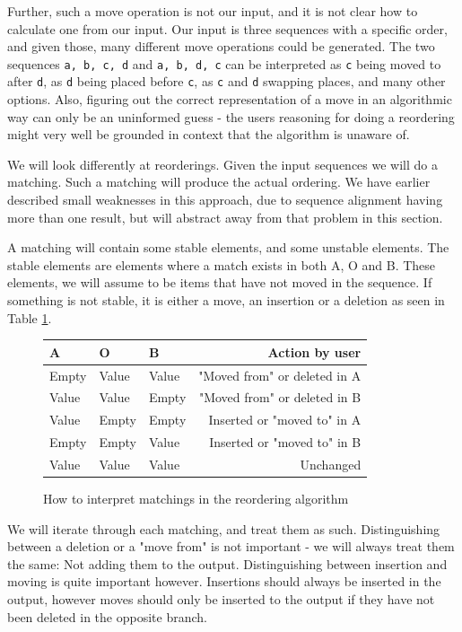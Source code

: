 \documentclass[11pt]{article}
\begin{document}
Further, such a move operation is not our input, and it is not clear how to calculate one from our input. Our input is three sequences with a specific order, and given those, many different move operations could be generated. The two sequences \texttt{a, b, c, d} and \texttt{a, b, d, c} can be interpreted as \texttt{c} being moved to after \texttt{d}, as \texttt{d} being placed before \texttt{c}, as \texttt{c} and \texttt{d} swapping places, and many other options. Also, figuring out the correct representation of a move in an algorithmic way can only be an uninformed guess - the users reasoning for doing a reordering might very well be grounded in context that the algorithm is unaware of.

We will look differently at reorderings. Given the input sequences we will do a matching. Such a matching will produce the actual ordering. We have earlier described small weaknesses in this approach, due to sequence alignment having more than one result, but will abstract away from that problem in this section.

A matching will contain some stable elements, and some unstable elements. The stable elements are elements where a match exists in both A, O and B. These elements, we will assume to be items that have not moved in the sequence. If something is not stable, it is either a move, an insertion or a deletion as seen in Table \ref{ReorderingTable}.

\begin{figure}
\centering
\begin{tabular}{ | l | l | l || r |}
  \hline                        
   \textbf{A} & \textbf{O} & \textbf{B} & \textbf{Action by user} \\
  \hline                        
  Empty & Value & Value & "Moved from" or deleted in A \\
  Value & Value & Empty & "Moved from" or deleted in B \\
  Value & Empty & Empty & Inserted or "moved to" in A \\
  Empty & Empty & Value & Inserted or "moved to" in B \\
  Value & Value & Value & Unchanged \\
  \hline  
\end{tabular}
  \caption{How to interpret matchings in the reordering algorithm}
\label{ReorderingTable}
\end{figure}

We will iterate through each matching, and treat them as such. Distinguishing between a deletion or a "move from" is not important - we will always treat them the same: Not adding them to the output. Distinguishing between insertion and moving is quite important however. Insertions should always be inserted in the output, however moves should only be inserted to the output if they have not been deleted in the opposite branch. 
\end{document}
